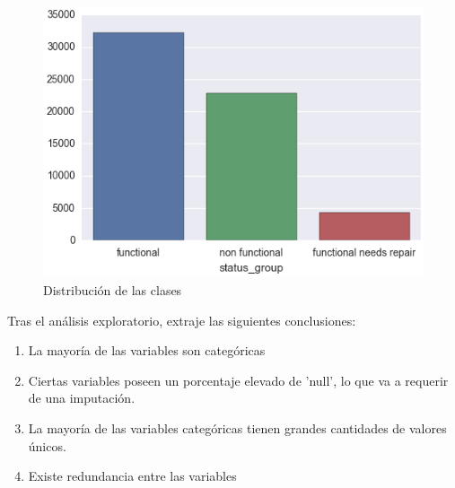 \begin{figure}[H] %
	\centering
	\includegraphics[scale=0.5]{clases.png}  %
	\caption{Distribución de las clases} 
	\label{fig:CLASES}
\end{figure}

Tras el análisis exploratorio, extraje las siguientes conclusiones:

\begin{enumerate}
	\item La mayoría de las variables son categóricas
	\item Ciertas variables poseen un porcentaje elevado de 'null', lo que va a requerir de una imputación.
	\item La mayoría de las variables categóricas tienen grandes cantidades de valores únicos.
	\item Existe redundancia entre las variables
\end{enumerate}

